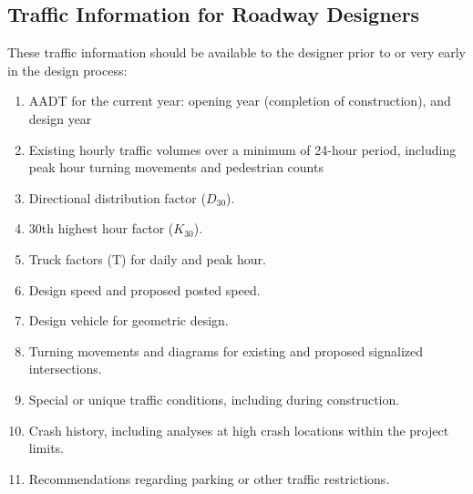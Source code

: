 \documentclass{article}
\begin{document}
  \subsection{Traffic Information for Roadway Designers}
  These traffic information should be available to the designer prior to or very early in the design process:
  \begin{enumerate}
    \item AADT for the current year: opening year (completion of construction), and design year
    \item Existing hourly traffic volumes over a minimum of 24-hour period, including peak hour turning movements and pedestrian counts
    \item Directional distribution factor ($D_{30}$).
    \item 30th highest hour factor ($K_{30}$).
    \item Truck factors (T) for daily and peak hour.
    \item Design speed and proposed posted speed.
    \item Design vehicle for geometric design.
    \item Turning movements and diagrams for existing and proposed signalized intersections.
    \item Special or unique traffic conditions, including during construction.
    \item Crash history, including analyses at high crash locations within the project limits.
    \item Recommendations regarding parking or other traffic restrictions.
  \end{enumerate}




\end{document}
